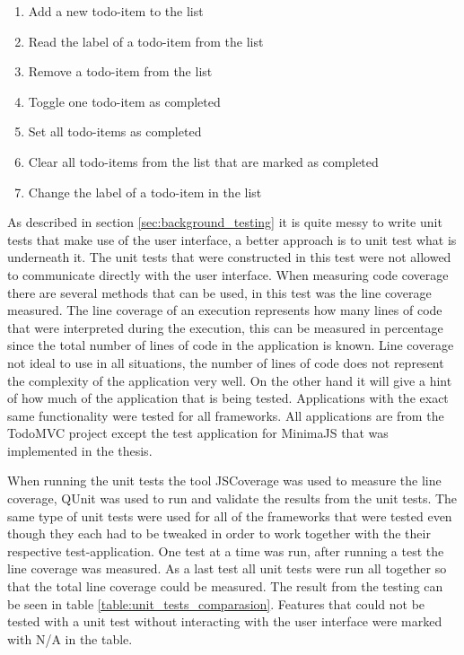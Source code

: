 \begin{enumerate}
	\item Add a new todo-item to the list
	\item Read the label of a todo-item from the list
	\item Remove a todo-item from the list
	\item Toggle one todo-item as completed
	\item Set all todo-items as completed
	\item Clear all todo-items from the list that are marked as completed
	\item Change the label of a todo-item in the list
\end{enumerate}

As described in section \ref{sec:background_testing} it is quite messy to write unit tests that make use of the user interface, a better approach is to unit test what is underneath it. The unit tests that were constructed in this test were not allowed to communicate directly with the user interface. When measuring code coverage there are several methods that can be used, in this test was the line coverage measured. The line coverage of an execution represents how many lines of code that were interpreted during the execution, this can be measured in percentage since the total number of lines of code in the application is known. Line coverage not ideal to use in all situations, the number of lines of code does not represent the complexity of the application very well. On the other hand it will give a hint of how much of the application that is being tested. Applications with the exact same functionality were tested for all frameworks. All applications are from the TodoMVC project except the test application for MinimaJS that was implemented in the thesis. 

When running the unit tests the tool JSCoverage was used to measure the line coverage, QUnit was used to run and validate the results from the unit tests. The same type of unit tests were used for all of the frameworks that were tested even though they each had to be tweaked in order to work together with the their respective test-application. One test at a time was run, after running a test the line coverage was measured. As a last test all unit tests were run all together so that the total line coverage could be measured. The result from the testing can be seen in table \ref{table:unit_tests_comparasion}. Features that could not be tested with a unit test without interacting with the user interface were marked with N/A in the table.

